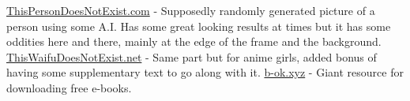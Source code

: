 \documentclass{article}
\begin{document}
\href{https://thispersondoesnotexist.com/}{ThisPersonDoesNotExist.com} - Supposedly randomly generated picture of a person using some A.I. Has some great looking results at times but it has some oddities here and there, mainly at the edge of the frame and the background.\\
\href{https://www.thiswaifudoesnotexist.net/}{ThisWaifuDoesNotExist.net} - Same part but for anime girls, added bonus of having some supplementary text to go along with it.
\href{https://b-ok.xyz/}{b-ok.xyz} - Giant resource for downloading free e-books.
\end{document}
